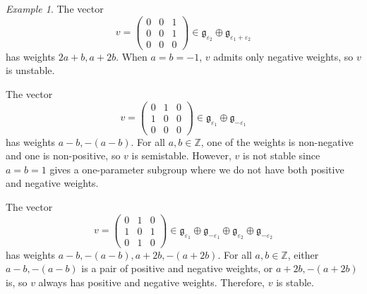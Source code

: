 \documentclass[12pt]{amsart}
\newcommand{\g}{\mathfrak{g}}
\theoremstyle{remark}
\theoremstyle{remark}
\newtheorem*{example}{Example}
\theoremstyle{remark}
\begin{document}
\begin{example}
The vector 
$$v = \begin{pmatrix} 0 & 0 & 1 \\ 0 & 0 & 1 \\ 0 & 0 & 0 \end{pmatrix} \in \g_{\varepsilon_2} \oplus \g_{\varepsilon_1 + \varepsilon_2}$$
has weights $2a + b, a + 2b$.
When $a = b = -1$, $v$ admits only negative weights, so $v$ is unstable.

The vector 
$$v = \begin{pmatrix} 0 & 1 & 0 \\ 1 & 0 & 0 \\ 0 & 0 & 0 \end{pmatrix} \in \g_{\varepsilon_1} \oplus \g_{-\varepsilon_1}$$
has weights $a-b, - (a-b)$.
For all $a, b \in \mathbb{Z}$, one of the weights is non-negative and one is non-positive, so $v$ is semistable.
However, $v$ is not stable since $a=b=1$ gives a one-parameter subgroup where we do not have both positive and negative weights.

The vector 
$$v = \begin{pmatrix} 0 & 1 & 0 \\ 1 & 0 & 1 \\ 0 & 1 & 0 \end{pmatrix} \in  \g_{\varepsilon_1} \oplus \g_{-\varepsilon_1} \oplus  \g_{\varepsilon_2} \oplus \g_{-\varepsilon_2}$$
has weights $a-b, -(a-b), a+2b, -(a+2b)$.
For all $a, b \in \mathbb{Z}$, either $a-b, -(a-b)$ is a pair of positive and negative weights, or $a+2b, -(a+2b)$ is, so $v$ always has positive and negative weights.
Therefore, $v$ is stable.
\end{example}
\end{document}
